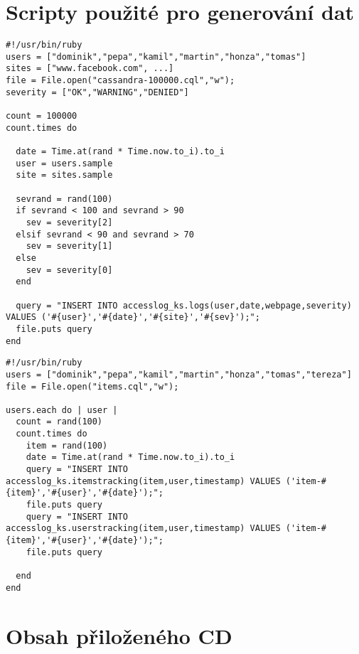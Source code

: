 \documentclass[thesis=M,czech]{FITthesis}[2012/06/26]
\begin{document}
\chapter{Scripty použité pro generování dat}
\lstset{language=Ruby}          %
\begin{lstlisting}[caption={Generování přístupů z Access Logů},label=CQL3]
#!/usr/bin/ruby
users = ["dominik","pepa","kamil","martin","honza","tomas"]
sites = ["www.facebook.com", ...]
file = File.open("cassandra-100000.cql","w");
severity = ["OK","WARNING","DENIED"]

count = 100000
count.times do
  
  date = Time.at(rand * Time.now.to_i).to_i
  user = users.sample
  site = sites.sample
  
  sevrand = rand(100)
  if sevrand < 100 and sevrand > 90
    sev = severity[2]
  elsif sevrand < 90 and sevrand > 70
    sev = severity[1]
  else
    sev = severity[0]
  end
  
  query = "INSERT INTO accesslog_ks.logs(user,date,webpage,severity) VALUES ('#{user}','#{date}','#{site}','#{sev}');";
  file.puts query   
end
\end{lstlisting}
\pagebreak
\begin{lstlisting}[caption={Generování transakčních událostí},label=CQL3]
#!/usr/bin/ruby
users = ["dominik","pepa","kamil","martin","honza","tomas","tereza"]
file = File.open("items.cql","w");

users.each do | user |
  count = rand(100)
  count.times do
    item = rand(100)
    date = Time.at(rand * Time.now.to_i).to_i
    query = "INSERT INTO accesslog_ks.itemstracking(item,user,timestamp) VALUES ('item-#{item}','#{user}','#{date}');";
    file.puts query       
    query = "INSERT INTO accesslog_ks.userstracking(item,user,timestamp) VALUES ('item-#{item}','#{user}','#{date}');";
    file.puts query    
  
  end
end 
\end{lstlisting}

\chapter{Obsah přiloženého CD}


\begin{figure}
\end{figure}
\end{document}
